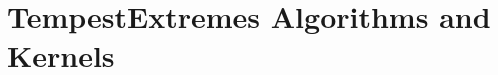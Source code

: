 \documentclass[gmdd, hvmath, online]{copernicus_discussions}
\begin{document}


\section{TempestExtremes Algorithms and Kernels} \label{sec:Kernels}
\end{document}
